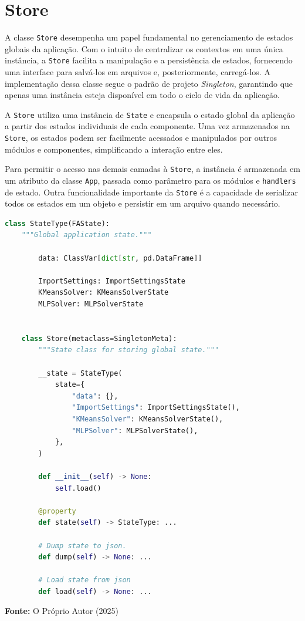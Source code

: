 \section{Store}
\label{sec:3:store}

A classe \texttt{Store} desempenha um papel fundamental no gerenciamento de estados globais da aplicação. Com o intuito de centralizar os contextos em uma única instância, a \texttt{Store} facilita a manipulação e a persistência de estados, fornecendo uma interface para salvá-los em arquivos e, posteriormente, carregá-los. A implementação dessa classe segue o padrão de projeto \textit{Singleton}, garantindo que apenas uma instância esteja disponível em todo o ciclo de vida da aplicação.

A \texttt{Store} utiliza uma instância de \texttt{State} e encapsula o estado global da aplicação a partir dos estados individuais de cada componente. Uma vez armazenados na \texttt{Store}, os estados podem ser facilmente acessados e manipulados por outros módulos e componentes, simplificando a interação entre eles.

Para permitir o acesso nas demais camadas à \texttt{Store}, a instância é armazenada em um atributo da classe \texttt{App}, passada como parâmetro para os módulos e \texttt{handlers} de estado. Outra funcionalidade importante da \texttt{Store} é a capacidade de serializar todos os estados em um objeto e persistir em um arquivo quando necessário.

\begin{center}
    \begin{lstlisting}[language=Python, numbers=right, basicstyle=\tiny, label={lst:store}, caption={Pseudo-Implementação da classe \texttt{Store}.}]
    class StateType(FAState):
    """Global application state."""

        data: ClassVar[dict[str, pd.DataFrame]]

        ImportSettings: ImportSettingsState
        KMeansSolver: KMeansSolverState
        MLPSolver: MLPSolverState


    class Store(metaclass=SingletonMeta):
        """State class for storing global state."""

        __state = StateType(
            state={
                "data": {},
                "ImportSettings": ImportSettingsState(),
                "KMeansSolver": KMeansSolverState(),
                "MLPSolver": MLPSolverState(),
            },
        )

        def __init__(self) -> None:
            self.load()

        @property
        def state(self) -> StateType: ...

        # Dump state to json.
        def dump(self) -> None: ...

        # Load state from json
        def load(self) -> None: ...
    \end{lstlisting}
    \centerline{\textbf{Fonte:} O Próprio Autor (2025)}
\end{center}

